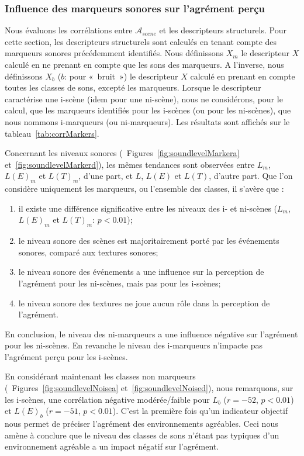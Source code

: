 \documentclass[twoside,twocolumn]{article}
\begin{document}
\subsubsection*{Influence des marqueurs sonores sur l'agrément perçu}

Nous évaluons les corrélations entre $\mathcal{A}_{scene}$ et les descripteurs structurels. Pour cette section, les descripteurs structurels sont calculés en tenant compte des marqueurs sonores précédemment identifiés. Nous définissons $X_m$ le descripteur $X$ calculé en ne prenant en compte que les sons des marqueurs. A l'inverse, nous définissons $X_b$ ($b$: pour «~bruit~») le descripteur $X$ calculé en prenant en compte toutes les classes de sons, excepté les marqueurs. Lorsque le descripteur caractérise une i-scène (idem pour une ni-scène), nous ne considérons, pour le calcul, que les marqueurs identifiés pour les i-scènes (ou pour les ni-scènes), que nous nommons i-marqueurs (ou ni-marqueurs). Les résultats sont affichés sur le tableau~\ref{tab:corrMarkers}.

Concernant les niveaux sonores (\cf~Figures~\ref{fig:soundlevelMarkera} et~\ref{fig:soundlevelMarkerd}), les mêmes tendances sont observées entre $L_m$, $L(E)_m$ et $L(T)_m$, d'une part, et $L$, $L(E)$ et $L(T)$, d'autre part. Que l'on considère uniquement les marqueurs, ou l'ensemble des classes, il s'avère que :

\begin{enumerate}
\item il existe une différence significative entre les niveaux des i- et ni-scènes ($L_m$, $L(E)_m$ et $L(T)_m$: $p<0.01$);
\item le niveau sonore des scènes est majoritairement porté par les événements sonores, comparé aux textures sonores;
\item le niveau sonore des événements a une influence sur la perception de l'agrément pour les ni-scènes, mais pas pour les i-scènes;
\item le niveau sonore des textures ne joue aucun rôle dans la perception de l'agrément.
\end{enumerate}

En conclusion, le niveau des ni-marqueurs a une influence négative sur l'agrément pour les ni-scènes. En revanche le niveau des i-marqueurs n’impacte pas l'agrément perçu pour les i-scènes.

En considérant maintenant les classes non marqueurs (\cf~Figures~\ref{fig:soundlevelNoisea} et~\ref{fig:soundlevelNoised}), nous remarquons, sur les i-scènes, une corrélation négative modérée/faible pour $L_b$  ($r=-52$, $p<0.01$) et $L(E)_b$ ($r=-51$, $p<0.01$). C'est la première fois qu'un indicateur objectif nous permet de préciser l'agrément des environnements agréables. Ceci nous amène à conclure que le niveau des classes de sons n'étant pas typiques d'un environnement agréable a un impact négatif sur l'agrément.
\end{document}
